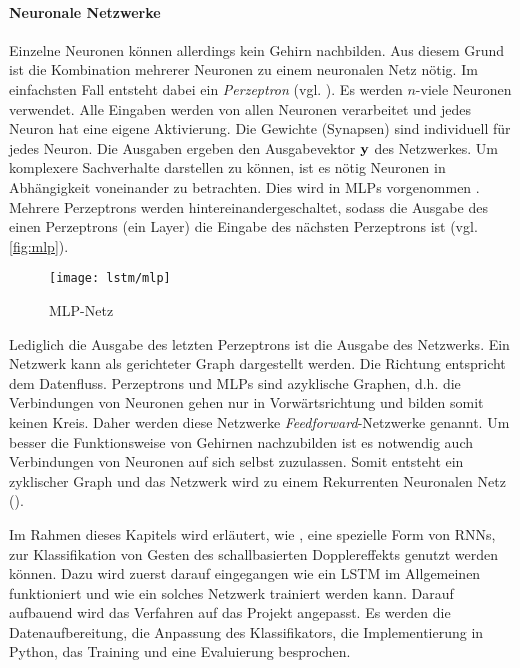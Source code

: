 \paragraph{Neuronale Netzwerke}
Einzelne Neuronen können allerdings kein Gehirn nachbilden. Aus diesem Grund ist
die Kombination mehrerer Neuronen zu einem neuronalen Netz nötig. Im einfachsten
Fall entsteht dabei ein \textit{Perzeptron} (vgl.
\cite{rosenblatt58a,1165576}). Es werden $n$-viele Neuronen verwendet. Alle
Eingaben werden von allen Neuronen verarbeitet und jedes Neuron hat eine eigene
Aktivierung. Die Gewichte (Synapsen) sind individuell für jedes Neuron. Die
Ausgaben ergeben den Ausgabevektor $\bf{y}$ des Netzwerkes. Um komplexere
Sachverhalte darstellen zu können, ist es nötig Neuronen in Abhängigkeit
voneinander zu betrachten. Dies wird in \acp{MLP} vorgenommen \cite{1165576}.
Mehrere Perzeptrons werden hintereinandergeschaltet, sodass die Ausgabe des
einen Perzeptrons (ein Layer) die Eingabe des nächsten Perzeptrons ist (vgl.
\autoref{fig:mlp}).
\begin{figure}[htbp]
    \centering
   \texttt{[image: lstm/mlp]}
\caption{MLP-Netz}
\label{fig:mlp}
\end{figure}
Lediglich die Ausgabe des letzten Perzeptrons ist die Ausgabe des Netzwerks.
Ein Netzwerk kann als gerichteter Graph dargestellt werden. Die Richtung
entspricht dem Datenfluss. Perzeptrons und \acp{MLP} sind azyklische Graphen,
d.h. die Verbindungen von Neuronen gehen nur in Vorwärtsrichtung und bilden
somit keinen Kreis. Daher werden diese Netzwerke \textit{Feedforward}-Netzwerke
genannt. Um besser die Funktionsweise von Gehirnen nachzubilden ist es notwendig
auch Verbindungen von Neuronen auf sich selbst zuzulassen. Somit entsteht ein
zyklischer Graph und das Netzwerk wird zu einem Rekurrenten Neuronalen Netz
(). \cite{RainerSchmoll2006}

Im Rahmen dieses Kapitels wird erläutert, wie , eine spezielle Form
von \acp{RNN}, zur Klassifikation von Gesten des schallbasierten Dopplereffekts
genutzt werden können. Dazu wird zuerst darauf eingegangen wie ein \ac{LSTM} im
Allgemeinen funktioniert und wie ein solches Netzwerk trainiert werden kann.
Darauf aufbauend wird das Verfahren auf das Projekt angepasst. Es werden die
Datenaufbereitung, die Anpassung des Klassifikators, die Implementierung in
Python, das Training und eine Evaluierung besprochen.



